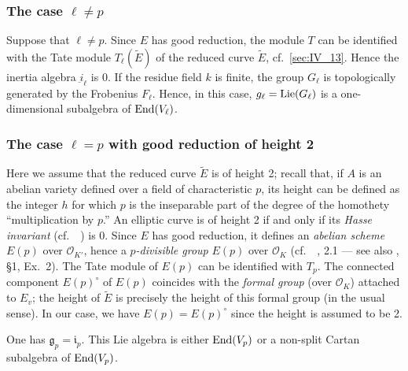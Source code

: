 \begin{subappendices}
\subsubsection{The case \texorpdfstring{$\ell \ne p$}{ℓ ̸/= p}}
\label{sec:IV_A21}

Suppose that $\ell \neq p$. Since $E$ has good reduction, the module
$T$ can be identified with the Tate module $T_\ell(\tilde{E})$ of the reduced
curve $\tilde{E}$, cf.\ \ref{sec:IV_13}. Hence the inertia algebra
$\underbar{i}_\ell$ is $0$. If the residue field $k$ is finite, the group
$G_\ell$ is topologically generated by the Frobenius $F_\ell$. Hence, in this
case, $g_\ell = \operatorname{Lie}(G_\ell)$ is a one-dimensional subalgebra of $\operatorname{End}(V_\ell)$.

\subsubsection{The case \texorpdfstring{$\ell = p$}{ℓ = p} with good
reduction of height 2}
\label{sec:IV_A22}
Here we assume that the reduced curve $\widetilde{E}$ is of height 2; recall
that, if $A$ is an abelian variety defined over a field of characteristic $p$,
its height can be defined as the integer $h$ for which $p$ is the inseparable
part of the degree of the homothety ``multiplication by $p$.'' An elliptic
curve is of height 2 if and only if its \emph{Hasse invariant} (cf.\
\citeauthor{9}~\cite{9}) is 0. Since $E$ has good reduction, it defines an
\emph{abelian scheme} $E(p)$ over $\mathcal{O}_{K'}$, hence a
\emph{$p$-divisible group} $E(p)$ over $\mathcal{O}_K$ (cf.\
\citeauthor{39}~\cite{39}, 2.1 --- see also \cite{26}, \S1, Ex.~2).
The Tate module of $E(p)$ can be identified with $T_p$.
The connected component $E(p)^\circ$ of $E(p)$ coincides with the \emph{formal
group} (over $\mathcal{O}_K$) attached to $E_v$; the height of $\widetilde{E}$
is precisely the height of this formal group (in the usual sense).
In our case, we have $E(p) = E(p)^\circ$ since the height is assumed to be 2.

\begin{thm}
	One has $\mathfrak{g}_p = \mathfrak{i}_p$. This Lie algebra is either
	$\operatorname{End}(V_p)$ or a non-split Cartan subalgebra of $\operatorname{End}(V_p)$.
\end{thm}


\end{subappendices}
